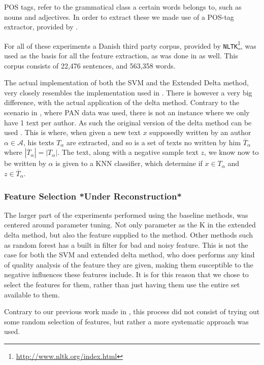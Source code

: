 \gls{POS} tags, refer to the grammatical class a certain words belongs to, such
as nouns and adjectives. In order to extract these we made use of a POS-tag
extractor, provided by \citet{polyglot}.

For all of these experiments a Danish third party corpus, provided by
\texttt{NLTK}\footnote{\url{http://www.nltk.org/index.html}}, was used as the
basis for all the feature extraction, as was done in \citet{US} as well. This
corpus consists of 22,476 sentences, and 563,358 words.

The actual implementation of both the \gls{SVM} and the Extended Delta method,
very closely resembles the implementation used in \citet{US}. There is however a
very big difference, with the actual application of the delta method. Contrary
to the scenario in \citet{US}, where PAN data was used, there is not an instance
where we only have 1 text per author. As such the original version of the
delta method can be used \citep{evert2015towards}. This is where, when given a
new text $x$ supposedly written by an author $\alpha \in \mathcal{A}$, his
texts $T_\alpha$ are extracted, and so is a set of texts no written by him
$\overline{T}_\alpha$ where $|\overline{T}_\alpha| = |T_\alpha|$. The text,
along with a negative sample text $z$, we know now to be written by $\alpha$ is
given to a \gls{KNN} classifier, which determine if $x \in T_\alpha$ and $z \in
\overline{T}_\alpha$.

\subsubsection{Feature Selection *Under Reconstruction*}

The larger part of the experiments performed using the baseline methods, was
centered around parameter tuning. Not only parameter as the K in the extended
delta method, but also the feature supplied to the method. Other methods such
as random forest has a built in filter for bad and noisy feature. This is not
the case for both the \gls{SVM} and extended delta method, who does performs any
kind of quality analysis of the feature they are given, making them susceptible
to the negative influences these features include. It is for this reason that
we chose to select the features for them, rather than just having them use the
entire set available to them.

Contrary to our previous work made in \citet{US}, this process did not
consist of trying out some random selection of features, but rather
a more systematic approach was used.

